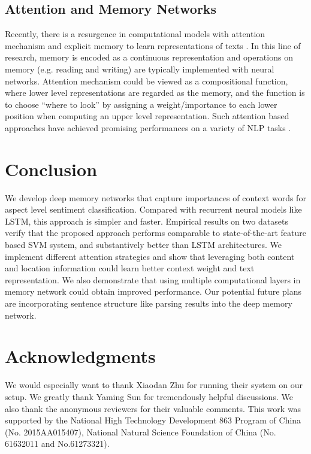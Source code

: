 \documentclass[11pt,letterpaper]{article}
\begin{document}
\subsection{Attention and Memory Networks}
Recently, there is a resurgence in computational models with attention mechanism and explicit memory to learn representations of texts \cite{Graves2014neural,Weston2014memory,Sukhbaatar2015end,Bahdanau2015}. 
In this line of research, memory is encoded as a continuous representation and operations on memory (e.g. reading and writing) are typically implemented with neural networks. 
Attention mechanism could be viewed as a compositional function, where lower level representations are regarded as the memory, and the function is to choose ``where to look'' by assigning a weight/importance to each lower position when computing an upper level representation.
Such attention based approaches have achieved promising performances on a variety of NLP tasks \cite{Luong2015EMNLP,Kumar2015ask,Rush2015}.




\section{Conclusion}
We develop deep memory networks that capture importances of context words for aspect level sentiment classification.
Compared with recurrent neural models like LSTM, this approach is simpler and faster.
Empirical results on two datasets verify that the proposed approach performs comparable to state-of-the-art feature based SVM system, and substantively better than LSTM architectures.
We implement different attention strategies
and show that leveraging both content and location information could learn better context weight and text representation. 
We also demonstrate that using multiple computational layers in memory network could obtain improved performance.
Our potential future plans are incorporating sentence structure like parsing results into the deep memory network.

\section*{Acknowledgments}
We would especially want to thank Xiaodan Zhu  for running their system on our setup.
We greatly thank Yaming Sun for tremendously helpful discussions. 
We also thank the anonymous reviewers for their valuable comments.
This work was supported by the National High Technology Development 863 Program of China (No. 2015AA015407), National Natural Science Foundation of China (No. 61632011 and No.61273321).




\end{document}

